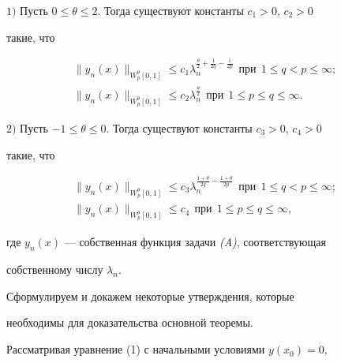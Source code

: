 \begin{thmnonum} 


$1)$ Пусть $0\le\theta\le2$. Тогда существуют константы $c_1>0$, $c_2>0$ 


такие, что 


\begin{gather*} 


\|y_n(x)\|_{W^\theta_p[0,1]}\le c_1 


\lambda_n^{\frac{\theta}{2}+\frac{1}{2q}-\frac{1}{2p}} 


\ \ \text{при}\ \ 1\le q<p\le\infty;\\ 


% 


\|y_n(x)\|_{W^\theta_p[0,1]}\le c_2\lambda_n^{\frac{\theta}{2}} 


\ \ \text{при}\ \ 1\le p\le q\le \infty. 


\end{gather*} 


 


$2)$ Пусть $-1\le\theta\le0$. Тогда существуют константы $c_3>0$, $c_4>0$ 


такие, что 


\begin{gather*} 


\|y_n(x)\|_{W^\theta_p[0,1]}\le c_3 


\lambda_n^{\frac{1+\theta}{2q}-\frac{1+\theta}{2p}} 


\ \ \text{при}\ \ 1\le q<p\le\infty;\\ 


% 


\|y_n(x)\|_{W^\theta_p[0,1]}\le c_4 


\ \ \text{при}\ \ 1\le p\le q\le\infty,


\end{gather*} 


где $y_n(x)$ --- собственная функция задачи {\em (A)}, соответствующая 


собственному числу $\lambda_n$. 


\end{thmnonum} 


 


Сформулируем и докажем некоторые утверждения, которые 


необходимы для доказательства основной теоремы. 


 


Рассматривая уравнение (1) с начальными условиями $y(x_0)=0$, 


